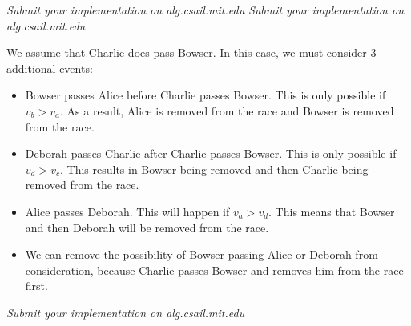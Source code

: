 \documentclass[12pt,twoside]{article}
\begin{document}
\begin{problems}
\begin{problemparts}
\problempart \emph{Submit your implementation on alg.csail.mit.edu}
\problempart \emph{Submit your implementation on alg.csail.mit.edu}


\problempart We assume that Charlie does pass Bowser. In this case, we must consider 3 additional events:
\begin{itemize}
\item Bowser passes Alice before Charlie passes Bowser. This is only possible if $v_b > v_a$. As a result, Alice is removed from the race and Bowser is removed from the race.
\item Deborah passes Charlie after Charlie passes Bowser. This is only possible if $v_d > v_c$. This results in Bowser being removed and then Charlie being removed from the race.
\item Alice passes Deborah. This will happen if $v_a > v_d$. This means that Bowser and then Deborah will be removed from the race.
\item We can remove the possibility of Bowser passing Alice or Deborah from consideration, because Charlie passes Bowser and removes him from the race first.

\end{itemize}



\problempart \emph{Submit your implementation on alg.csail.mit.edu}
\end{problemparts}

\end{problems}
\end{document}
